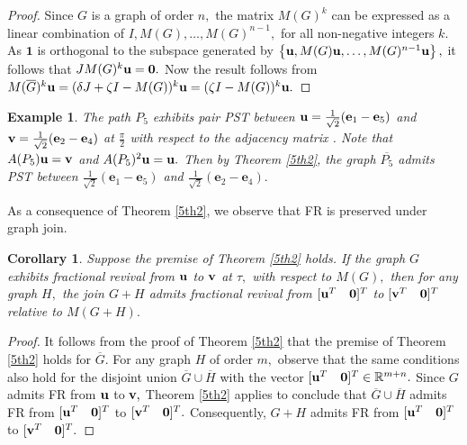 \documentclass[12pt,a4paper]{article}
\newtheorem{cor}{Corollary}
\newtheorem{exm}{Example}
\def \e {{\bf e}}
\def \u {{\bf u}}
\def \v {{\bf v}}
\def \e {{\mathbf e}}
\newcommand{\cb}[1]{\left\lbrace #1\right\rbrace}
\begin{document}
 \begin{proof}
 Since $G$ is a graph of order $n,$ the matrix $M(G)^k$ can be expressed as a linear combination of $I, M(G),\ldots, M(G)^{n-1},$ for all non-negative integers $k.$ As $\mathbf{1}$ is orthogonal to the subspace generated by $\cb{\u,M(G)\u,\ldots, M(G)^{n-1}\u},$ it follows that $JM(G)^k\u=\mathbf{0}.$ Now the result follows from $M(\overline{G})^k\u=(\delta J+\zeta I-M(G))^k\u=(\zeta I-M(G))^k\u.$ 
 \end{proof}
 \begin{exm}\label{5ex2}
     The path $P_5$ exhibits pair PST between $\u=\frac{1}{\sqrt{2}}(\e_1-\e_5)$ and $\v=\frac{1}{\sqrt{2}}(\e_2-\e_4)$ at $\frac{\pi}{2}$ with respect to the adjacency matrix \cite{pal10}. Note that $A(P_5)\u=\v$ and  $A(P_5)^2\u=\u.$ Then by Theorem \ref{5th2}, the graph $\overline{P_5}$ admits PST between $\frac{1}{\sqrt{2}}(\e_1-\e_5)$ and $\frac{1}{\sqrt{2}}(\e_2-\e_4).$
 \end{exm}
As a consequence of Theorem \ref{5th2}, we observe that FR is preserved under graph join.
 \begin{cor}\label{5co2}
     Suppose the premise of Theorem \ref{5th2} holds. If the graph $G$ exhibits fractional revival from $\u$ to $\v$ at $\tau,$ with respect to $M(G),$ then for any graph $H,$ the join $G+H$ admits fractional revival from $[\u^T\quad\mathbf{0}]^T$ to $[\v^T\quad\mathbf{0}]^T$ relative to $M(G+H).$   
 \end{cor}
\begin{proof}
It follows from the proof of Theorem \ref{5th2} that the premise of Theorem \ref{5th2} holds for $\overline{G}.$  For any graph $H$ of order $m,$ observe that the same conditions also hold for the disjoint union $\overline{G}\cup \overline{H}$ with the vector $[\u^T\quad\mathbf{0}]^T\in \mathbb{R}^{m+n}.$   
    Since $G$ admits FR from $\u$ to $\v,$ Theorem \ref{5th2} applies to conclude that $\overline{G}\cup \overline{H}$ admits FR from $[\u^T\quad\mathbf{0}]^T$ to $[\v^T\quad\mathbf{0}]^T.$ Consequently, $G+H$ admits FR from $[\u^T\quad\mathbf{0}]^T$ to $[\v^T\quad\mathbf{0}]^T.$
\end{proof}
\end{document}
